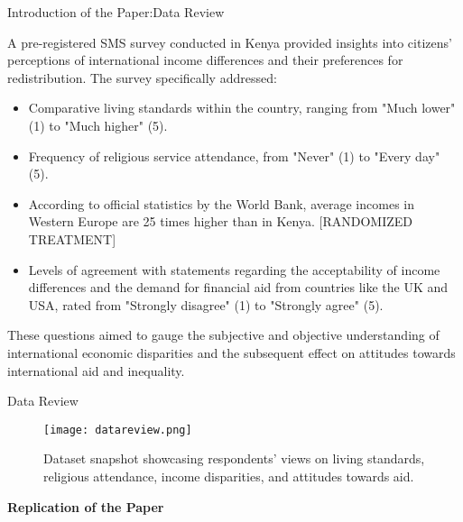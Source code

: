\documentclass[aspectratio=169,10pt,compress]{beamer}
\begin{document}
 \begin{frame}{Introduction of the Paper:Data Review}
  \hspace*{1cm} %
  \begin{minipage}{\dimexpr\textwidth-2cm} %
    \vspace{1cm} %
    A pre-registered SMS survey conducted in Kenya provided insights into citizens' perceptions of international income differences and their preferences for redistribution. The survey specifically addressed:

    \begin{itemize}
      \item Comparative living standards within the country, ranging from "Much lower" (1) to "Much higher" (5).
      \item Frequency of religious service attendance, from "Never" (1) to "Every day" (5).
      \item According to official statistics by the World Bank, average incomes in Western Europe are 25 times higher than in Kenya. [RANDOMIZED TREATMENT]
      \item Levels of agreement with statements regarding the acceptability of income differences and the demand for financial aid from countries like the UK and USA, rated from "Strongly disagree" (1) to "Strongly agree" (5).
    \end{itemize}

    These questions aimed to gauge the subjective and objective understanding of international economic disparities and the subsequent effect on attitudes towards international aid and inequality.

    \vspace{1cm} %
  \end{minipage}
  \hspace*{-1cm} %
\end{frame}
\begin{frame}{Data Review}
  \begin{figure}
    \centering
    \texttt{[image: datareview.png]}
    \caption{Dataset snapshot showcasing respondents' views on living standards, religious attendance, income disparities, and attitudes towards aid.}
  \end{figure}
\end{frame}

\begin{frame}
\centering
\LARGE{\textbf{Replication of the Paper}}
\end{frame}
\end{document}
